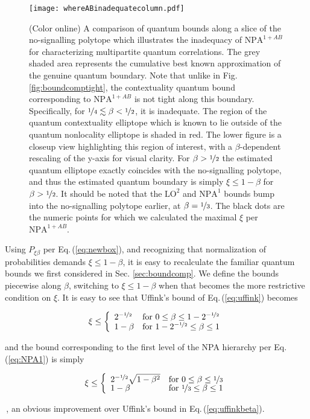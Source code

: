 \documentclass[
  12pt          %
  ,letterpaper  %
  ,center       %
  ,noupper      %
  ,english,fleqn]{uconnthesis}
\newcommand{\LeftEqns}[1]{\begin{fleqn}[\leftmargini minus \leftmargini]\begin{align}#1\end{align}\end{fleqn}}
\newcommand{\LeftEqn}[1]{\LeftEqns{\begin{split}#1\end{split}}}
\newcommand{\acases}[1]{{\renewcommand{\arraystretch}{0.75}\left\lbrace\begin{array}{ll} #1\end{array}\right.}}
\newcommand{\ceq}[1]{Eq.\,(\ref{#1})}
\newcommand{\fig}[1]{Fig.\,\ref{#1}}
\begin{document}
\begin{figure}[ht]
\centering
\begin{minipage}[t]{1\textwidth}
    \texttt{[image: whereABinadequatecolumn.pdf]}
    \caption{(Color online) A comparison of quantum bounds along a slice of the no-signalling \gls{polytope} which illustrates the inadequacy of $\mbox{NPA}^{1+AB}$ for characterizing multipartite quantum correlations. The grey shaded area represents the cumulative best known approximation of the genuine quantum boundary. Note that unlike in \fig{fig:boundcomptight}, the contextuality quantum bound corresponding to $\mbox{NPA}^{1+AB}$ is not tight along this boundary. Specifically, for $\nicefrac{1}{4}\lesssim \beta < \nicefrac{1}{2}$, it is inadequate. The region of the quantum contextuality \gls{elliptope} which is known to lie outside of the quantum nonlocality elliptope is shaded in red. The lower figure is a closeup view highlighting this region of interest, with a $\beta$-dependent rescaling of the y-axis for visual clarity. For $\beta > \nicefrac{1}{2}$ the estimated quantum elliptope exactly coincides with the no-signalling polytope, and thus the estimated quantum boundary is simply $\xi \leq 1-\beta$ for $\beta > \nicefrac{1}{2}$. It should be noted that the $\mbox{LO}^2$ and $\mbox{NPA}^1$ bounds bump into the no-signalling polytope earlier, at $\beta = \nicefrac{1}{3}$. The black dots are the numeric points for which we calculated the maximal $\xi$ per $\mbox{NPA}^{1+AB}$.}\label{fig:betatohalf}
\end{minipage}
\end{figure}

\FloatBarrier
Using $P_{\xi \beta}$ per \ceq{eq:newbox}, and recognizing that normalization of probabilities demands $\xi \leq 1-\beta$, it is easy to recalculate the familiar quantum bounds we first considered in Sec. \ref{sec:boundcomp}. We define the bounds piecewise along $\beta$, switching to $\xi\leq 1-\beta$ when that becomes the more restrictive condition on $\xi$. It is easy to see that Uffink's bound of \ceq{eq:uffink} becomes
\LeftEqn{\label{eq:uffinkbeta}
\xi \leq \acases{ 2^{-\nicefrac{1}{2}} & \text{for }0\leq \beta \leq 1-2^{-\nicefrac{1}{2}} \\ 1-\beta & \text{for }1-2^{-\nicefrac{1}{2}} \leq \beta \leq 1 }
}
and the bound corresponding to the first level of the NPA hierarchy per \ceq{eq:NPA1} is simply
\LeftEqn{
\xi \leq \acases{ 2^{-\nicefrac{1}{2}}\sqrt{1-\beta ^2} & \text{for }0\leq \beta \leq \nicefrac{1}{3} \\ 1-\beta & \text{for }\nicefrac{1}{3} \leq \beta \leq 1 }
}\,,
an obvious improvement over Uffink's bound in \ceq{eq:uffinkbeta}. 
\end{document}
